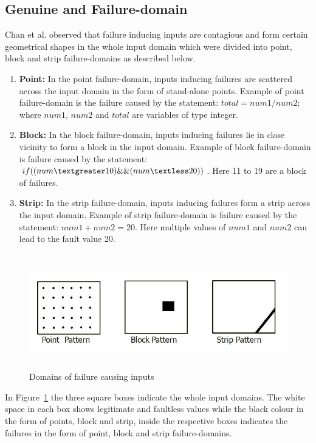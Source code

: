 \subsection{Genuine and Failure-domain}
\label{sec:genuineandfailuredomain}
Chan et al. observed that failure inducing inputs are contagious and form certain geometrical shapes in the whole input domain which were divided into point, block and strip failure-domains as described below.

\begin{enumerate}
\item {\bf Point:} In the point failure-domain, inputs inducing failures are scattered across the input domain in the form of stand-alone points. Example of point failure-domain is the failure caused by the statement: $total = num1/num2;$ where $num1$, $num2$ and $total$ are variables of type integer.
\item {\bf Block:} In the block failure-domain, inputs inducing failures lie in close vicinity to form a block in the input domain. Example of block failure-domain is failure caused by the statement: $if ( (num \textgreater 10) \&\& (num \textless 20) )$. Here 11 to 19 are a block of failures.
\item {\bf Strip:} In the strip failure-domain, inputs inducing failures form a strip across the input domain. Example of strip failure-domain is failure caused by the statement: $num1 + num2 = 20$. Here multiple values of $num1$ and $num2$ can lead to the fault value 20. 
\end{enumerate}



\begin{figure}[h]
	\centering
	\centerline{\includegraphics[width=13cm, height=5cm ]{chapter2/pointblockstrip.jpg}}
	\caption{Domains of failure causing inputs~\cite{chan1996proportional}}
	\label{fig:patterns2}
\end{figure}

In Figure~\ref{fig:patterns2} the three square boxes indicate the whole input domains. The white space in each box shows legitimate and faultless values while the black colour in the form of points, block and strip, inside the respective boxes indicates the failures in the form of point, block and strip failure-domains.


